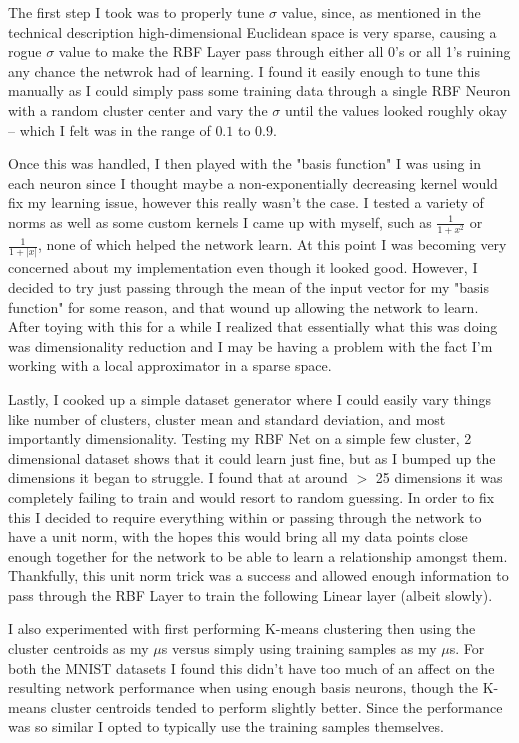 \documentclass[12pt, twoside]{report}
\begin{document}
The first step I took was to properly tune $\sigma$ value, since, as mentioned in the
technical description high-dimensional Euclidean space is very sparse, causing a rogue $\sigma$ value
to make the RBF Layer pass through either all 0's or all 1's ruining any chance the netwrok had of learning.
I found it easily enough to tune this manually as I could simply pass some training data through a single 
RBF Neuron with a random cluster center and vary the $\sigma$ until the values looked roughly okay – which
I felt was in the range of $0.1$ to $0.9$.

Once this was handled, I then played with the "basis function" I was using in each neuron since I thought
maybe a non-exponentially decreasing kernel would fix my learning issue, however this really wasn't the case.
I tested a variety of norms as well as some custom kernels I came up with myself, such as $\frac{1}{1+x^2}$ or
$\frac{1}{1+|x|}$, none of which helped the network learn. At this point I was becoming very concerned about my 
implementation even though it looked good. However, I decided to try just passing through the mean of the 
input vector for my "basis function" for some reason, and that wound up allowing the network to learn.
After toying with this for a while I realized that essentially what this was doing was dimensionality reduction
and I may be having a problem with the fact I'm working with a local approximator in a sparse space.

Lastly, I cooked up a simple dataset generator where I could easily vary things like number of clusters,
cluster mean and standard deviation, and most importantly dimensionality. Testing my RBF Net on a simple
few cluster, 2 dimensional dataset shows that it could learn just fine, but as I bumped up the dimensions it 
began to struggle. I found that at around $>$ 25 dimensions it was completely failing to train and would
resort to random guessing. In order to fix this I decided to require everything within or passing through
the network to have a unit norm, with the hopes this would bring all my data points close enough together for
the network to be able to learn a relationship amongst them. Thankfully, this unit norm trick was a success
and allowed enough information to pass through the RBF Layer to train the following Linear layer
(albeit slowly).

I also experimented with first performing K-means clustering then using the cluster centroids as my $\mu$s 
versus simply using training samples as my $\mu$s. For both the MNIST datasets I found this didn't have too much
of an affect on the resulting network performance when using enough basis neurons, though the K-means cluster 
centroids tended to perform slightly better. 
Since the performance was so similar I opted to typically use the training samples themselves.
\end{document}
